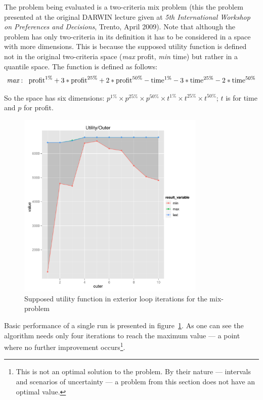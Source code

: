 The problem being evaluated is a two-criteria mix problem (this the problem
presented at the original DARWIN lecture given at \textit{5th International
  Workshop on Preferences and Decisions}, Trento, April 2009). Note that
although the problem has only two-criteria in its definition it has to be
considered in a space with more dimensions. This is because the supposed
utility function is defined not in the original two-criteria space
(\textit{max} profit, \textit{min} time) but rather in a quantile space. The
function is defined as follows:
\begin{equation*}
\textit{max}: \hspace{0.2cm} \text{profit}^{1\%} + 3 * \text{profit}^{25\%} +
2 * \text{profit}^{50\%} - \text{time}^{1\%} - 3 * \text{time}^{25\%} - 2 *
\text{time}^{50\%}
\end{equation*}

So the space has six dimensions: $p^{1\%} \times p^{25\%} \times p^{50\%}
\times t^{1\%} \times t^{25\%} \times t^{50\%}$; $t$ is for time and $p$ for
profit.

\begin{figure}
  \centering
  \includegraphics[width=0.8\textwidth]{exp/uncert/pres_utilouter}
  \caption{Supposed utility function in exterior loop iterations for the
    mix-problem}
  \label{pres_utilouter}
\end{figure}

Basic performance of a single run is presented in
figure~\ref{pres_utilouter}. As one can see the algorithm needs only four
iterations to reach the maximum value --- a point where no further improvement
occurs\footnote{This is not an optimal solution to the problem. By their
  nature --- intervals and scenarios of uncertainty --- a problem from this
  section does not have an optimal value.}.


